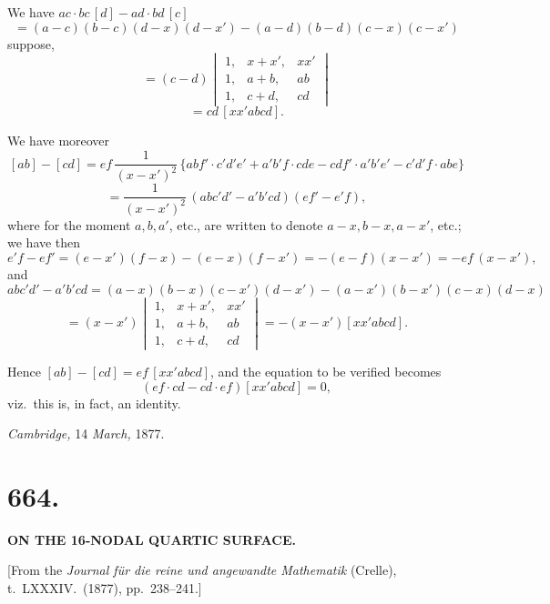 \documentclass[11pt,a4paper]{article}
\begin{document}
\medskip

We have $ac \cdot bc\,[d] - ad \cdot bd\,[c]$
\[
= (a - c)(b - c)(d - x)(d - x') - (a - d)(b - d)(c - x)(c - x')
\]
suppose,
\[
= (c - d)\begin{vmatrix} 1, & x + x', & xx'\\ 1, & a + b, & ab\\ 1, & c + d, & cd \end{vmatrix}
\]
\[
= cd\,[xx'abcd].
\]

\newpage


\noindent We have moreover
\[
[ab] - [cd] = ef\,\frac{1}{(x - x')^{2}}\,\{abf' \cdot c'd'e' + a'b'f \cdot cde - cdf' \cdot a'b'e' - c'd'f \cdot abe\}
\]
\[
= \frac{1}{(x - x')^{2}}\,(abc'd' - a'b'cd)(ef' - e'f),
\]
where for the moment $a, b, a'$, etc., are written to denote $a - x, b - x, a - x'$, etc.; we have then
\[
e'f - ef' = (e - x')(f - x) - (e - x)(f - x') = -(e - f)(x - x') = -ef\,(x - x'),
\]
and
\[
abc'd' - a'b'cd = (a - x)(b - x)(c - x')(d - x') - (a - x')(b - x')(c - x)(d - x)
\]
\[
= (x - x')\begin{vmatrix} 1, & x + x', & xx'\\ 1, & a + b, & ab\\ 1, & c + d, & cd \end{vmatrix} = -(x - x')[xx'abcd].
\]

Hence $[ab] - [cd] = ef\,[xx'abcd]$, and the equation to be verified becomes
\[
(ef \cdot cd - cd \cdot ef)[xx'abcd] = 0,
\]
viz.\ this is, in fact, an identity.

\medskip

\hfill \emph{Cambridge,} 14 \emph{March,} 1877.

\newpage



\section*{664.}

\begin{center}
\textbf{ON THE 16-NODAL QUARTIC SURFACE.}
\end{center}

\medskip

\begin{center}
[From the \emph{Journal f\"ur die reine und angewandte Mathematik} (Crelle), t.~LXXXIV.\ (1877), pp.~238--241.]
\end{center}
\end{document}

